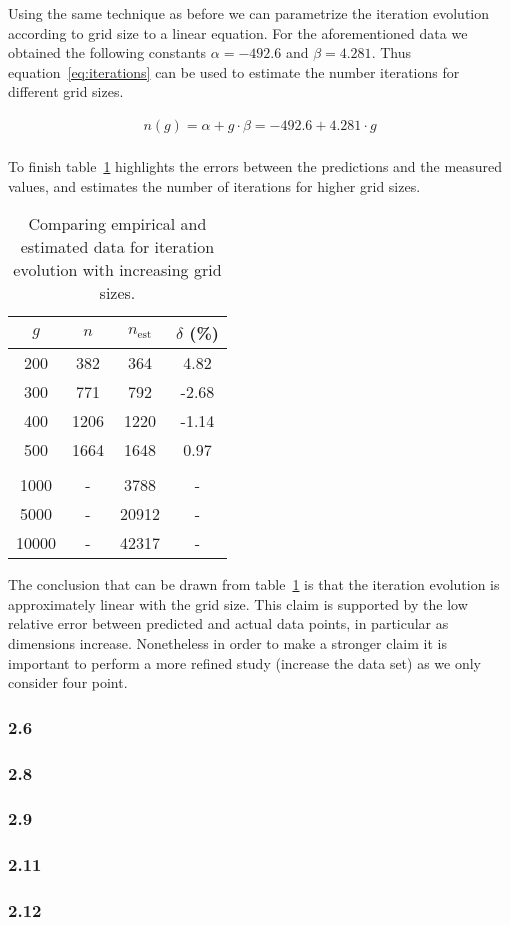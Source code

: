 Using the same technique as before we can parametrize the iteration evolution according to grid size to a linear equation.
For the aforementioned data we obtained the following constants $\alpha = -492.6$ and $\beta = 4.281$.
Thus equation~\ref{eq:iterations} can be used to estimate the number iterations for different grid sizes.

\begin{eqnarray}
n(g) = \alpha + g \cdot \beta = -492.6 + 4.281 \cdot g\\
\label{eq:iterations}
\end{eqnarray}

To finish table~\ref{tbl:est-iterations} highlights the errors between the predictions and the measured values, and estimates the number of iterations for higher grid sizes.

\begin{table}[H]
\centering
\begin{tabular}{*{4}{c}}
 \toprule
$g$      &    $n$   &   $n_{\text{est}}$   &   $\delta$ (\%) \\ \midrule
200      &    382   &   364                &    4.82         \\
300      &    771   &   792                &   -2.68         \\
400      &   1206   &   1220               &   -1.14         \\
500      &   1664   &   1648               &    0.97         \\\\
1000     &    -     &   3788               &     -           \\
5000     &    -     &   20912              &     -           \\
10000    &    -     &   42317              &     -           \\
\bottomrule
\end{tabular}
\caption{Comparing empirical and estimated data for iteration evolution with increasing grid sizes.}
\label{tbl:est-iterations}
\end{table}

The conclusion that can be drawn from table~\ref{tbl:est-iterations} is that the iteration evolution is approximately linear with the grid size. This claim is supported by the low relative error between predicted and actual data points, in particular as dimensions increase. Nonetheless in order to make a stronger claim it is important to perform a more refined study (\ie increase the data set) as we only consider four point.




\subsubsection{2.6}

\subsubsection{2.8}
\subsubsection{2.9}
\subsubsection{2.11}
\subsubsection{2.12}